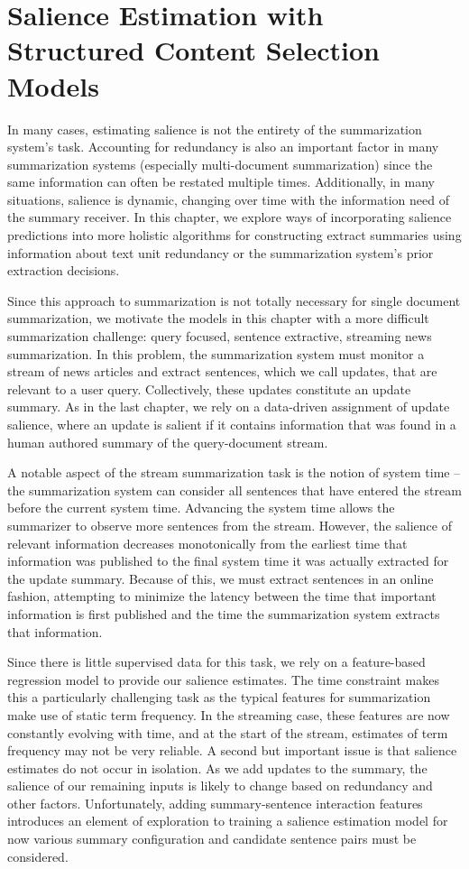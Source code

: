 \chapter{Salience Estimation with Structured Content Selection Models}
\label{ch:mlsum}

\startglyph In many cases, estimating salience is not the entirety of the
summarization system's task. Accounting for redundancy is also an important
factor in many summarization systems (especially multi-document summarization)
since the same information can often be restated multiple times. Additionally,
in many situations, salience is dynamic, changing over time with the
information need of the summary receiver.  In this chapter, we explore ways of
incorporating salience predictions into more holistic algorithms for
constructing extract summaries using information about text unit redundancy or
the summarization system's prior extraction decisions.  

Since this approach to summarization is not totally necessary for single
document summarization, we motivate the models in this chapter with a more
difficult summarization challenge: query focused, sentence extractive,
streaming news summarization.  In this problem, the summarization system must
monitor a stream of news articles and extract sentences, which we call updates,
that are relevant to a user query. Collectively, these updates constitute an
update summary.  As in the last chapter, we rely on a data-driven assignment of
update salience, where an update is salient if it contains information that was
found in a human authored summary of the query-document stream. 

A notable aspect of the stream summarization task is the notion of system time
-- the summarization system can consider all sentences that have entered the
stream before the current system time. Advancing the system time allows the
summarizer to observe more sentences from the stream. However, the salience of
relevant information decreases monotonically from the earliest time that
information was published to the final system time it was actually extracted
for the update summary.  Because of this, we must extract sentences in an
online fashion, attempting to minimize the latency between the time that
important information is first published and the time the summarization system
extracts that information.

Since there is little supervised data for this task, we rely on a feature-based
regression model to provide our salience estimates.   The time constraint makes
this a particularly challenging task as the typical features for summarization
make use of static term frequency.  In the streaming case, these features are
now constantly evolving with time, and at the start of the stream, estimates of
term frequency may not be very reliable.  A second but important issue is that
salience estimates do not occur in isolation. As we add updates to the summary,
the salience of our remaining inputs is likely to change based on redundancy
and other factors.  Unfortunately, adding summary-sentence interaction features
introduces an element of exploration to training a salience estimation model
for now various summary configuration and candidate sentence pairs must be
considered.

